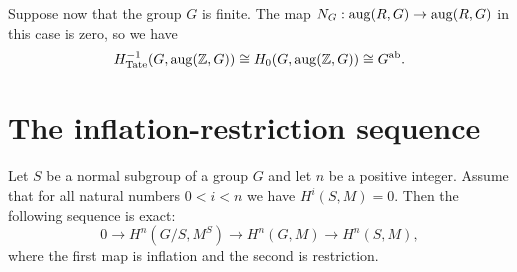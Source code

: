 Suppose now that the group $G$ is finite.
The map $N_G : \mathrm{aug}(R,G) \to \mathrm{aug}(R,G)$ in this case is zero, so we have
\begin{equation}
	\label{eq:Tate -1 aug}
	H^{-1}_{\mathrm{Tate}}(G,\mathrm{aug}({\mathbb Z},G)) \cong H_{0}(G, \mathrm{aug}({\mathbb Z},G)) \cong G^{\mathrm{ab}}.
\end{equation}









\section{The inflation-restriction sequence}

\begin{theorem}
	\label{thm:inflation restriction sequence}
	\leanok
	Let $S$ be a normal subgroup of a group $G$ and let $n$ be a positive integer.
	Assume that for all natural numbers $0 <i < n$ we have $H^{i}(S,M)=0$.
	Then the following sequence is exact:
	\[
		0 \to H^{n}(G/S, M^S) \to H^{n}(G,M) \to H^{n}(S,M),
	\]
	where the first map is inflation and the second is restriction.
\end{theorem}

